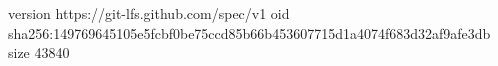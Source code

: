 version https://git-lfs.github.com/spec/v1
oid sha256:149769645105e5fcbf0be75ccd85b66b453607715d1a4074f683d32af9afe3db
size 43840

